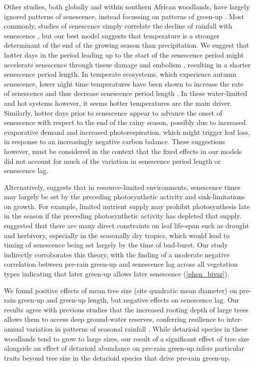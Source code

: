 \documentclass[11pt,a4paper]{article}
\begin{document}
Other studies, both globally and within southern African woodlands, have
largely ignored patterns of senescence, instead focussing on patterns of
green-up \citep{Gallinat2015}. Most commonly, studies of senescence simply correlate
the decline of rainfall with senescence \citep{Stevens2016, Guan2014}, but our
best model suggests that temperature is a stronger determinant of the end of
the growing season than precipitation. We suggest that hotter days in the
period leading up to the start of the senescence period might accelerate
senescence through tissue damage and embolism \citep{Cho2017}, resulting in a
shorter senescence period length. In temperate ecosystems, which experience
autumn senescence, lower night time temperatures have been shown to increase
the rate of senescence and thus decrease senescence period length
\citep{Michelson2017, Escamilla2020}. In these water-limited and hot systems
however, it seems hotter temperatures are the main driver. Similarly, hotter
days prior to senescence appear to advance the onset of senescence with respect
to the end of the rainy season, possibly due to increased evaporative demand
and increased photorespiration, which might trigger leaf loss, in response to
an increasingly negative carbon balance. These suggestions however, must be
considered in the context that the fixed effects in our models did not account
for much of the variation in senescence period length or senescence lag.

Alternatively, \citet{Zani2020} suggests that in resource-limited environments,
senescence times may largely be set by the preceding photosynthetic activity
and sink-limitations on growth. For example, limited nutrient supply may
prohibit photosynthesis late in the season if the preceding photosynthetic
activity has depleted that supply. \citet{Reich1992} suggested that there are
many direct constraints on leaf life-span such as drought and herbivory,
especially in the seasonally dry tropics, which would lead to timing of
senescence being set largely by the time of bud-burst. Our study indirectly
corroborates this theory, with the finding of a moderate negative correlation
between pre-rain green-up and senescence lag across all vegetation types
indicating that later green-up allows later senescence (\autoref{phen_bivar}).

We found positive effects of mean tree size (site quadratic mean diameter) on
pre-rain green-up and green-up length, but negative effects on senescence lag.
Our results agree with previous studies that the increased rooting depth of
large trees allows them to access deep ground-water reserves, conferring
resilience to inter-annual variation in patterns of seasonal rainfall
\citep{Holdo2017}. While detarioid species in these woodlands tend to grow to
large sizes, our result of a significant effect of tree size alongside an
effect of detarioid abundance on pre-rain green-up infers particular traits
beyond tree size in the detarioid species that drive pre-rain green-up.
\end{document}
